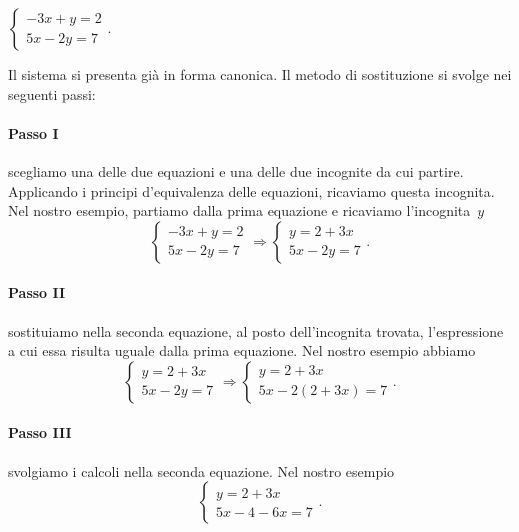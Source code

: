 \begin{exrig}
\begin{esempio}
$\left\{\begin{array}{l}-3x+y=2\\5x-2y=7\end{array}\right.$.
\end{esempio}

Il sistema si presenta già in forma canonica. Il metodo di
sostituzione si svolge nei seguenti passi:

\paragraph{Passo I} scegliamo una delle due equazioni e una
delle due incognite da cui partire. Applicando i principi
d'equivalenza delle equazioni, ricaviamo questa
incognita.
Nel nostro esempio, partiamo dalla prima equazione e ricaviamo
l'incognita~$y$
\[\left\{\begin{array}{l}
     -3x+y=2\\
     5x-2y=7
    \end{array}
\right.
\Rightarrow
\left\{\begin{array}{l}y=2+3x \\
	 5x-2y=7
\end{array}\right..\]

\paragraph{Passo II} sostituiamo nella seconda equazione, al posto
dell'incognita trovata, l'espressione
a cui essa risulta uguale dalla prima equazione. Nel nostro esempio abbiamo
\[\left\{\begin{array}{l}
     y=2+3x\\
     5x-2y=7
    \end{array}
\right.
\Rightarrow
\left\{\begin{array}{l}y=2+3x \\
	 5x-2(2+3x)=7
\end{array}\right..\]

\paragraph{Passo III} svolgiamo i calcoli nella seconda equazione.
Nel nostro esempio
\[\left\{\begin{array}{l}y=2+3x\\
5x-4-6x=7\end{array}\right..\]


\end{exrig}
